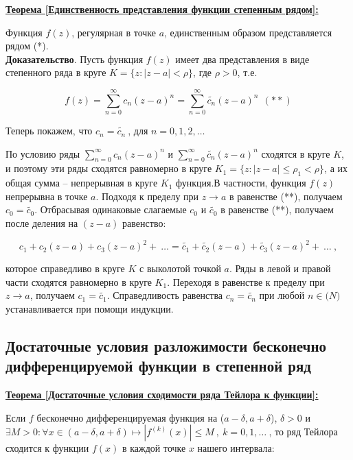 \documentclass[a4paper,12pt]{article} %
\begin{document}
\underline{\textbf{Теорема [Единственность представления функции степенным рядом]:}}

Функция $f(z)$, регулярная в точке $a$, единственным образом представляется рядом (*).\\

\textbf{Доказательство}. Пусть функция $f(z)$ имеет два представления в виде степенного ряда в круге $K = \{z: |z-a|<\rho\}$, где $\rho > 0$, т.е.

\begin{equation*}
f(z) = \sum\limits_{n = 0}^{\infty}c_n(z-a)^n = \sum\limits_{n = 0}^{\infty}\widetilde{c_n}(z-a)^n\ \ (**)
\end{equation*}

Теперь покажем, что $c_n = \widetilde{c_n} \ $, для $n = 0, 1, 2,\dots$

По условию ряды $\sum\limits_{n = 0}^{\infty}c_n(z-a)^n$ и $\sum\limits_{n = 0}^{\infty}\widetilde{c_n}(z-a)^n$ сходятся в круге $K$, и поэтому эти ряды сходятся равномерно в круге $K_1 = \{z: |z - a|\leqslant \rho_1 < \rho \}$, а их общая сумма -- непрерывная в круге $K_1$ функция.В частности, функция $f(z)$ непрерывна в точке $a$. Подходя к пределу при $z \to a$ в равенстве (**), получаем $c_0 = \widetilde{c_0}$. Отбрасывая одинаковые слагаемые $c_0$ и $\widetilde{c_0}$ в равенстве (**), получаем после деления на $(z - a)$ равенство:

\begin{equation*}
c_1 + c_2(z - a) + c_3(z - a)^2 +\ \dots = \widetilde{c_1} + \widetilde{c_2}(z - a) + \widetilde{c_3}(z - a)^2 +\ \dots\ ,
\end{equation*}

которое справедливо в круге $K$ с выколотой точкой $a$. Ряды в левой и правой части сходятся равномерно в круге $K_1$. Переходя в равенстве к пределу при $z \to a$, получаем $c_1 = \widetilde{c_1}$. Справедливость равенства $c_n = \widetilde{c_n}$ при любой $n \in \mathbb(N)$ устанавливается при помощи индукции.


\subsection{Достаточные условия разложимости бесконечно дифференцируемой функции в степенной ряд}

\underline{\textbf{Теорема [Достаточные условия сходимости ряда Тейлора к функции]:}} 

Если $f$ бесконечно дифференцируемая функция на ($a - \delta , a + \delta$), $\delta > 0$ и $\exists M > 0 : \forall x \in (a - \delta, a + \delta) \mapsto |f^{(k)}(x)| \leqslant M\ ,\ k = 0,1,\dots \ $, то ряд Тейлора сходится к функции $f(x)$ в каждой точке $x$ нашего интервала:
\end{document}

